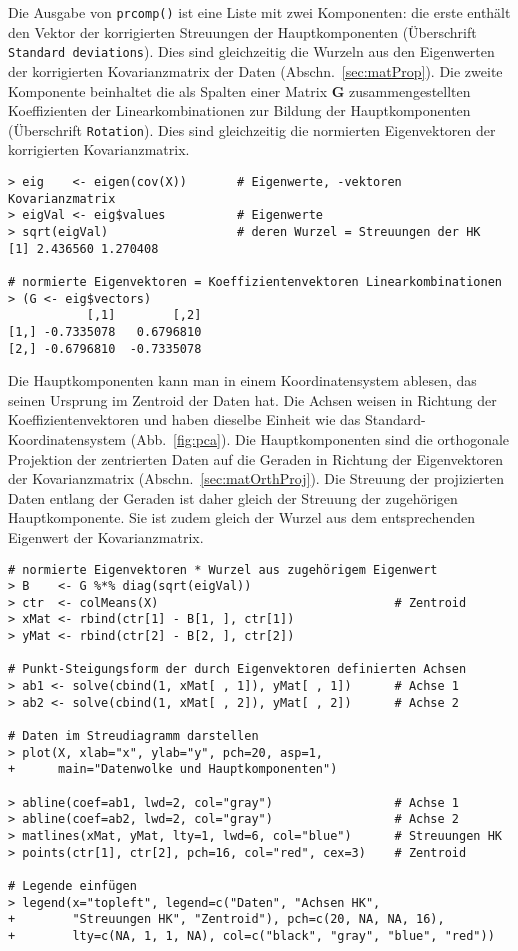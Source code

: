 Die Ausgabe von \lstinline!prcomp()! ist eine Liste mit zwei Komponenten: die erste enthält den Vektor der korrigierten Streuungen der Hauptkomponenten (Überschrift \lstinline!Standard deviations!). Dies sind gleichzeitig die Wurzeln aus den Eigenwerten der korrigierten Kovarianzmatrix der Daten (Abschn.\ \ref{sec:matProp}). Die zweite Komponente beinhaltet die als Spalten einer Matrix $\bm{G}$ zusammengestellten Koeffizienten der Linearkombinationen zur Bildung der Hauptkomponenten (Überschrift \lstinline!Rotation!). Dies sind gleichzeitig die normierten Eigenvektoren der korrigierten Kovarianzmatrix.
\begin{lstlisting}
> eig    <- eigen(cov(X))       # Eigenwerte, -vektoren Kovarianzmatrix
> eigVal <- eig$values          # Eigenwerte
> sqrt(eigVal)                  # deren Wurzel = Streuungen der HK
[1] 2.436560 1.270408

# normierte Eigenvektoren = Koeffizientenvektoren Linearkombinationen
> (G <- eig$vectors)
           [,1]        [,2]
[1,] -0.7335078   0.6796810
[2,] -0.6796810  -0.7335078
\end{lstlisting}

Die Hauptkomponenten kann man in einem Koordinatensystem ablesen, das seinen Ursprung im Zentroid der Daten hat. Die Achsen weisen in Richtung der Koeffizientenvektoren und haben dieselbe Einheit wie das Standard-Koordinatensystem (Abb.\ \ref{fig:pca}). Die Hauptkomponenten sind die orthogonale Projektion der zentrierten Daten auf die Geraden in Richtung der Eigenvektoren der Kovarianzmatrix (Abschn.\ \ref{sec:matOrthProj}). Die Streuung der projizierten Daten entlang der Geraden ist daher gleich der Streuung der zugehörigen Hauptkomponente. Sie ist zudem gleich der Wurzel aus dem entsprechenden Eigenwert der Kovarianzmatrix.
\begin{lstlisting}
# normierte Eigenvektoren * Wurzel aus zugehörigem Eigenwert
> B    <- G %*% diag(sqrt(eigVal))
> ctr  <- colMeans(X)                                 # Zentroid
> xMat <- rbind(ctr[1] - B[1, ], ctr[1])
> yMat <- rbind(ctr[2] - B[2, ], ctr[2])

# Punkt-Steigungsform der durch Eigenvektoren definierten Achsen
> ab1 <- solve(cbind(1, xMat[ , 1]), yMat[ , 1])      # Achse 1
> ab2 <- solve(cbind(1, xMat[ , 2]), yMat[ , 2])      # Achse 2

# Daten im Streudiagramm darstellen
> plot(X, xlab="x", ylab="y", pch=20, asp=1,
+      main="Datenwolke und Hauptkomponenten")

> abline(coef=ab1, lwd=2, col="gray")                 # Achse 1
> abline(coef=ab2, lwd=2, col="gray")                 # Achse 2
> matlines(xMat, yMat, lty=1, lwd=6, col="blue")      # Streuungen HK
> points(ctr[1], ctr[2], pch=16, col="red", cex=3)    # Zentroid

# Legende einfügen
> legend(x="topleft", legend=c("Daten", "Achsen HK",
+        "Streuungen HK", "Zentroid"), pch=c(20, NA, NA, 16),
+        lty=c(NA, 1, 1, NA), col=c("black", "gray", "blue", "red"))
\end{lstlisting}

